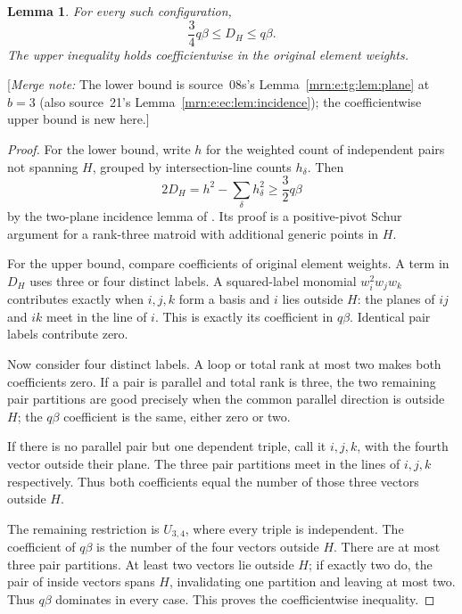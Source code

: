 \documentclass[11pt,a4paper]{article}
\newtheorem{lemma}[theorem]{Lemma}
\theoremstyle{remark}\newtheorem{remark}[theorem]{Remark}
\newcommand{\mnote}[1]{[\textit{Merge note:} #1]}
\begin{document}
\begin{lemma}\label{mrn:e:r7:lem:bounds}
For every such configuration,
\begin{equation}\label{mrn:e:r7:eq:DH}
 \frac34q\beta\le D_H\le q\beta.
\end{equation}
The upper inequality holds coefficientwise in the original element weights.
\end{lemma}
\mnote{The lower bound is source~08s's Lemma~\ref{mrn:e:tg:lem:plane} at $b=3$ (also source~21's Lemma~\ref{mrn:e:ec:lem:incidence}); the coefficientwise upper bound is new here.}
\begin{proof}
For the lower bound, write $h$ for the weighted count of independent pairs not spanning $H$, grouped by intersection-line counts $h_\delta$. Then
\[
 2D_H=h^2-\sum_\delta h_\delta^2\ge\frac32q\beta
\]
by the two-plane incidence lemma of \cite[Lemma 2.1]{b:m08s}. Its proof is a positive-pivot Schur argument for a rank-three matroid with additional generic points in $H$.

For the upper bound, compare coefficients of original element weights. A term in $D_H$ uses three or four distinct labels. A squared-label monomial $w_i^2w_jw_k$ contributes exactly when $i,j,k$ form a basis and $i$ lies outside $H$: the planes of $ij$ and $ik$ meet in the line of $i$. This is exactly its coefficient in $q\beta$. Identical pair labels contribute zero.

Now consider four distinct labels. A loop or total rank at most two makes both coefficients zero. If a pair is parallel and total rank is three, the two remaining pair partitions are good precisely when the common parallel direction is outside $H$; the $q\beta$ coefficient is the same, either zero or two.

If there is no parallel pair but one dependent triple, call it $i,j,k$, with the fourth vector outside their plane. The three pair partitions meet in the lines of $i,j,k$ respectively. Thus both coefficients equal the number of those three vectors outside $H$.

The remaining restriction is $U_{3,4}$, where every triple is independent. The coefficient of $q\beta$ is the number of the four vectors outside $H$. There are at most three pair partitions. At least two vectors lie outside $H$; if exactly two do, the pair of inside vectors spans $H$, invalidating one partition and leaving at most two. Thus $q\beta$ dominates in every case. This proves the coefficientwise inequality.
\end{proof}
\end{document}
